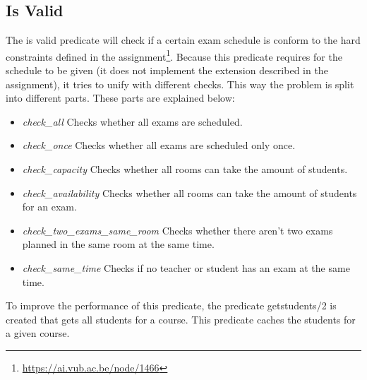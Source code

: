 \documentclass[11pt]{article}
\begin{document}
\subsection{Is Valid}
The is valid predicate will check if a certain exam schedule is conform to the hard constraints defined in the assignment\footnote{\url{https://ai.vub.ac.be/node/1466}}. Because this predicate requires for the schedule to be given (it does not implement the extension described in the assignment), it tries to unify with different checks. This way the problem is split into different parts. These parts are explained below:
\begin{itemize}
	\item \emph{check\_all} Checks whether all exams are scheduled.
	\item \emph{check\_once}  Checks whether all exams are scheduled only once.
	\item \emph{check\_capacity}  Checks whether all rooms can take the amount of students.
	\item \emph{check\_availability}  Checks whether all rooms can take the amount of students for an exam.
	\item \emph{check\_two\_exams\_same\_room}  Checks whether there aren't two exams planned in the same room at the same time.
	\item \emph{check\_same\_time} Checks if no teacher or student has an exam at the same time.
\end{itemize}
To improve the performance of this predicate, the predicate getstudents/2 is created that gets all students for a course. This predicate caches the students for a given course.
\end{document}
